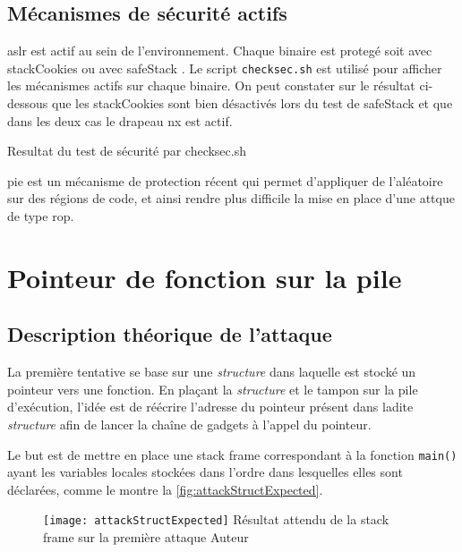 \subsection{Mécanismes de sécurité actifs}

\gls{aslr} est actif au sein de l'environnement. Chaque binaire est protegé soit avec \og \gls{stackCookies} \fg ou avec \og \gls{safeStack} \fg. Le script \texttt{checksec.sh} \cite{CheckSec} est utilisé pour afficher les mécanismes actifs sur chaque binaire. On peut constater sur le résultat ci-dessous que les \og \gls{stackCookies} \fg sont bien désactivés lors du test de \og \gls{safeStack} \fg et que dans les deux cas le drapeau \gls{nx} est actif.

\begin{listing}
	\caption{Resultat du test de sécurité par checksec.sh}
	\label{lst:checksecRes}
\end{listing}

\gls{pie} est un mécanisme de protection récent qui permet d'appliquer de l'aléatoire sur des régions de code, et ainsi rendre plus difficile la mise en place d'une attque de type \gls{rop}.


\section{Pointeur de fonction sur la pile}

\subsection{Description théorique de l'attaque}

La première tentative se base sur une \textit{structure} dans laquelle est stocké un pointeur vers une fonction. En plaçant la \textit{structure} et le tampon sur la pile d'exécution, l'idée est de réécrire l'adresse du pointeur présent dans ladite \textit{structure} afin de lancer la chaîne de gadgets à l'appel du pointeur.

Le but est de mettre en place une \og stack frame \fg correspondant à la fonction \texttt{main()} ayant les variables locales stockées dans l'ordre dans lesquelles elles sont déclarées, comme le montre la \autoref{fig:attackStructExpected}.

\begin{figure}[H]
	\centering
	\texttt{[image: attackStructExpected]}
	{Résultat attendu de la \og stack frame \fg sur la première attaque}
	{Auteur}
	\label{fig:attackStructExpected}
\end{figure}

